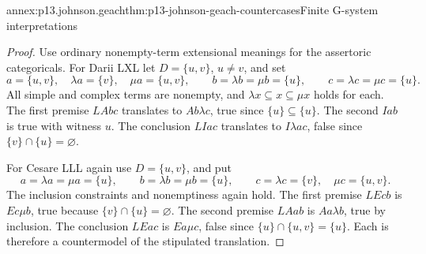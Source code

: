 \begin{annexitem}{annex:p13.johnson.geach}{thm:p13-johnson-geach-countercases}{Finite G-system interpretations}
\begin{proof}
Use ordinary nonempty-term extensional meanings for the assertoric
categoricals. For Darii LXL let \(D=\{u,v\}\), \(u\ne v\), and set
\[
 a=\{u,v\},\quad\lambda a=\{v\},\quad\mu a=\{u,v\},
 \qquad b=\lambda b=\mu b=\{u\},
 \qquad c=\lambda c=\mu c=\{u\}.
\]
All simple and complex terms are nonempty, and
\(\lambda x\subseteq x\subseteq\mu x\) holds for each.
The first premise \(LAbc\) translates to \(Ab\lambda c\),
true since \(\{u\}\subseteq\{u\}\).
The second \(Iab\) is true with witness \(u\).
The conclusion \(LIac\) translates to \(I\lambda a c\),
false since \(\{v\}\cap\{u\}=\varnothing\).

For Cesare LLL again use \(D=\{u,v\}\), and put
\[
 a=\lambda a=\mu a=\{u\},\qquad
 b=\lambda b=\mu b=\{u\},\qquad
 c=\lambda c=\{v\},\quad\mu c=\{u,v\}.
\]
The inclusion constraints and nonemptiness again hold.
The first premise \(LEcb\) is \(Ec\mu b\), true because
\(\{v\}\cap\{u\}=\varnothing\).
The second premise \(LAab\) is \(Aa\lambda b\), true by inclusion.
The conclusion \(LEac\) is \(Ea\mu c\), false since
\(\{u\}\cap\{u,v\}=\{u\}\).
Each is therefore a countermodel of the stipulated translation.
\end{proof}
\end{annexitem}
